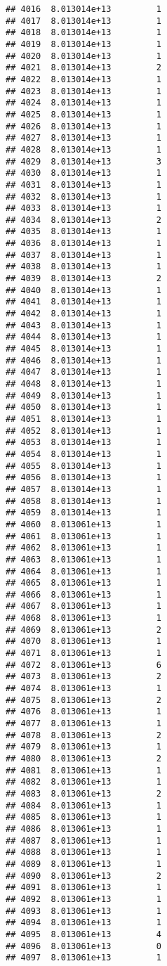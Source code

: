 \documentclass[
]{article}
\begin{document}
\begin{verbatim}
## 4016  8.013014e+13         1
## 4017  8.013014e+13         1
## 4018  8.013014e+13         1
## 4019  8.013014e+13         1
## 4020  8.013014e+13         1
## 4021  8.013014e+13         2
## 4022  8.013014e+13         1
## 4023  8.013014e+13         1
## 4024  8.013014e+13         1
## 4025  8.013014e+13         1
## 4026  8.013014e+13         1
## 4027  8.013014e+13         1
## 4028  8.013014e+13         1
## 4029  8.013014e+13         3
## 4030  8.013014e+13         1
## 4031  8.013014e+13         1
## 4032  8.013014e+13         1
## 4033  8.013014e+13         1
## 4034  8.013014e+13         2
## 4035  8.013014e+13         1
## 4036  8.013014e+13         1
## 4037  8.013014e+13         1
## 4038  8.013014e+13         1
## 4039  8.013014e+13         2
## 4040  8.013014e+13         1
## 4041  8.013014e+13         1
## 4042  8.013014e+13         1
## 4043  8.013014e+13         1
## 4044  8.013014e+13         1
## 4045  8.013014e+13         1
## 4046  8.013014e+13         1
## 4047  8.013014e+13         1
## 4048  8.013014e+13         1
## 4049  8.013014e+13         1
## 4050  8.013014e+13         1
## 4051  8.013014e+13         1
## 4052  8.013014e+13         1
## 4053  8.013014e+13         1
## 4054  8.013014e+13         1
## 4055  8.013014e+13         1
## 4056  8.013014e+13         1
## 4057  8.013014e+13         1
## 4058  8.013014e+13         1
## 4059  8.013014e+13         1
## 4060  8.013061e+13         1
## 4061  8.013061e+13         1
## 4062  8.013061e+13         1
## 4063  8.013061e+13         1
## 4064  8.013061e+13         1
## 4065  8.013061e+13         1
## 4066  8.013061e+13         1
## 4067  8.013061e+13         1
## 4068  8.013061e+13         1
## 4069  8.013061e+13         2
## 4070  8.013061e+13         1
## 4071  8.013061e+13         1
## 4072  8.013061e+13         6
## 4073  8.013061e+13         2
## 4074  8.013061e+13         1
## 4075  8.013061e+13         2
## 4076  8.013061e+13         1
## 4077  8.013061e+13         1
## 4078  8.013061e+13         2
## 4079  8.013061e+13         1
## 4080  8.013061e+13         2
## 4081  8.013061e+13         1
## 4082  8.013061e+13         1
## 4083  8.013061e+13         2
## 4084  8.013061e+13         1
## 4085  8.013061e+13         1
## 4086  8.013061e+13         1
## 4087  8.013061e+13         1
## 4088  8.013061e+13         1
## 4089  8.013061e+13         1
## 4090  8.013061e+13         2
## 4091  8.013061e+13         1
## 4092  8.013061e+13         1
## 4093  8.013061e+13         1
## 4094  8.013061e+13         1
## 4095  8.013061e+13         4
## 4096  8.013061e+13         0
## 4097  8.013061e+13         1

\end{verbatim}
\end{document}

